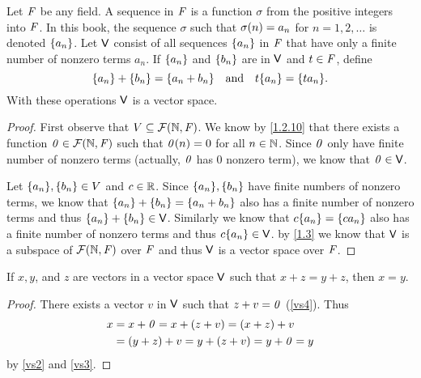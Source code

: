 \begin{eg}\label{1.2.13}
  Let \(\mathit{F}\) be any field.
  A sequence in \(\mathit{F}\) is a function \(\sigma\) from the positive integers into \(\mathit{F}\).
  In this book, the sequence \(\sigma\) such that \(\sigma\p{n} = a_{n}\) for \(n = 1, 2, \dots\) is denoted \(\left\lbrace a_{n}\right\rbrace\).
  Let \(\mathsf{V}\) consist of all sequences \(\left\lbrace a_{n}\right\rbrace\) in \(\mathit{F}\) that have only a finite number of nonzero terms \(a_{n}\).
  If \(\left\lbrace a_{n}\right\rbrace\) and \(\left\lbrace b_{n}\right\rbrace\) are in \(\mathsf{V}\) and \(t \in \mathit{F}\), define
  \[
    \set{a_{n}} + \set{b_{n}} = \set{a_{n} + b_{n}} \quad \text{and} \quad t\set{a_{n}} = \set{ta_{n}}.
  \]
  With these operations \(\mathsf{V}\) is a vector space.
\end{eg}

\begin{proof}
  First observe that \(V \subseteq \fs{\N}{\F}\).
  We know by \cref{1.2.10} that there exists a function \(\zv \in \fs{\N}{\F}\) such that \(\mathit{0}(n) = 0\) for all \(n \in \mathbb{N}\).
  Since \(\mathit{0}\) only have finite number of nonzero terms (actually, \(\mathit{0}\) has \(0\) nonzero term), we know that \(\mathit{0} \in \mathsf{V}\).

  Let \(\B{a_{n}}, \B{b_{n}} \in V\) and \(c \in \mathbb{R}\).
  Since \(\B{a_{n}}, \B{b_{n}}\) have finite numbers of nonzero terms, we know that \(\left\lbrace a_{n}\right\rbrace + \left\lbrace b_{n}\right\rbrace = \left\lbrace a_{n} + b_{n}\right\rbrace\) also has a finite number of nonzero terms and thus \(\left\lbrace a_{n}\right\rbrace + \left\lbrace b_{n}\right\rbrace \in \mathsf{V}\).
  Similarly we know that \(c\B{a_{n}} = \B{ca_{n}}\) also has a finite number of nonzero terms and thus \(c\B{a_{n}} \in \V\).
  by \cref{1.3} we know that \(\mathsf{V}\) is a subspace of \(\fs{\N}{\F}\) over \(\mathit{F}\) and thus \(\mathsf{V}\) is a vector space over \(\mathit{F}\).
\end{proof}

\begin{thm}\label{1.1}
  If \(x, y\), and \(z\) are vectors in a vector space \(\mathsf{V}\) such that \(x + z = y + z\), then \(x = y\).
\end{thm}

\begin{proof}
  There exists a vector \(v\) in \(\mathsf{V}\) such that \(z + v = \mathit{0}\) (\ref{vs4}).
  Thus
  \begin{align*}
    x & = x + \mathit{0} = x + \left\lparen z + v\right\rparen = \left\lparen x + z\right\rparen + v     \\
      & = \left\lparen y + z\right\rparen + v = y + \left\lparen z + v\right\rparen = y + \mathit{0} = y
  \end{align*}
  by \ref{vs2} and \ref{vs3}.
\end{proof}


